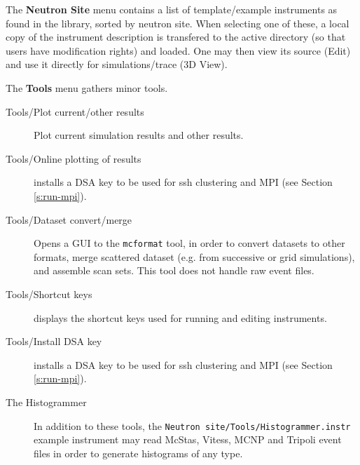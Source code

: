 \noindent The {\bf Neutron Site} menu contains a list of
template/example instruments as found in the \MCS library, sorted by
neutron site. When selecting one of these, a local copy of the
instrument description is transfered to the active directory (so that
users have modification rights) and loaded. One may then view its source (Edit) and use it directly for simulations/trace (3D View).


\noindent The {\bf Tools} menu gathers minor tools.
\begin{description}
\item[Tools/Plot current/other results] Plot current simulation results and other results.
\item[Tools/Online plotting of results] installs a DSA key to be used for ssh clustering and MPI (see Section \ref{s:run-mpi}).
\item[Tools/Dataset convert/merge] Opens a GUI to the \verb+mcformat+ tool, in order to convert datasets to other formats, merge scattered dataset (e.g. from successive or grid simulations), and assemble scan sets. This tool does not handle raw event files.
\item[Tools/Shortcut keys] displays the shortcut keys used for running and editing instruments.
\item[Tools/Install DSA key] installs a DSA key to be used for ssh clustering and MPI (see Section \ref{s:run-mpi}).
\item[The Histogrammer] In addition to these tools, the \verb+Neutron site/Tools/Histogrammer.instr+ example instrument may read McStas, Vitess, MCNP and Tripoli event files in order to generate histograms of any type.
\end{description}


